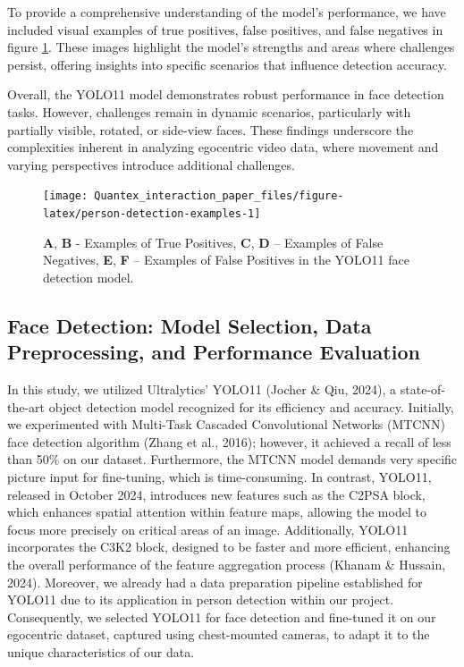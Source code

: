 \documentclass[
  man,floatsintext]{apa6}
\begin{document}
To provide a comprehensive understanding of the model's performance, we have included visual examples of true positives, false positives, and false negatives in figure \ref{fig:person-detection-examples}. These images highlight the model's strengths and areas where challenges persist, offering insights into specific scenarios that influence detection accuracy.

Overall, the YOLO11 model demonstrates robust performance in face detection tasks. However, challenges remain in dynamic scenarios, particularly with partially visible, rotated, or side-view faces. These findings underscore the complexities inherent in analyzing egocentric video data, where movement and varying perspectives introduce additional challenges.

\begin{figure}

{\centering \texttt{[image: Quantex\_interaction\_paper\_files/figure-latex/person-detection-examples-1]} 

}

\caption{\textbf{A}, \textbf{B} - Examples of True Positives, \textbf{C}, \textbf{D} – Examples of False Negatives, \textbf{E}, \textbf{F} – Examples of False Positives in the YOLO11 face detection model.}\label{fig:person-detection-examples}
\end{figure}

\subsection{Face Detection: Model Selection, Data Preprocessing, and Performance Evaluation}\label{face-detection-model-selection-data-preprocessing-and-performance-evaluation}

In this study, we utilized Ultralytics' YOLO11 (Jocher \& Qiu, 2024), a state-of-the-art object detection model recognized for its efficiency and accuracy. Initially, we experimented with Multi-Task Cascaded Convolutional Networks (MTCNN) face detection algorithm (Zhang et al., 2016); however, it achieved a recall of less than 50\% on our dataset. Furthermore, the MTCNN model demands very specific picture input for fine-tuning, which is time-consuming. In contrast, YOLO11, released in October 2024, introduces new features such as the C2PSA block, which enhances spatial attention within feature maps, allowing the model to focus more precisely on critical areas of an image. Additionally, YOLO11 incorporates the C3K2 block, designed to be faster and more efficient, enhancing the overall performance of the feature aggregation process (Khanam \& Hussain, 2024). Moreover, we already had a data preparation pipeline established for YOLO11 due to its application in person detection within our project. Consequently, we selected YOLO11 for face detection and fine-tuned it on our egocentric dataset, captured using chest-mounted cameras, to adapt it to the unique characteristics of our data.
\end{document}
